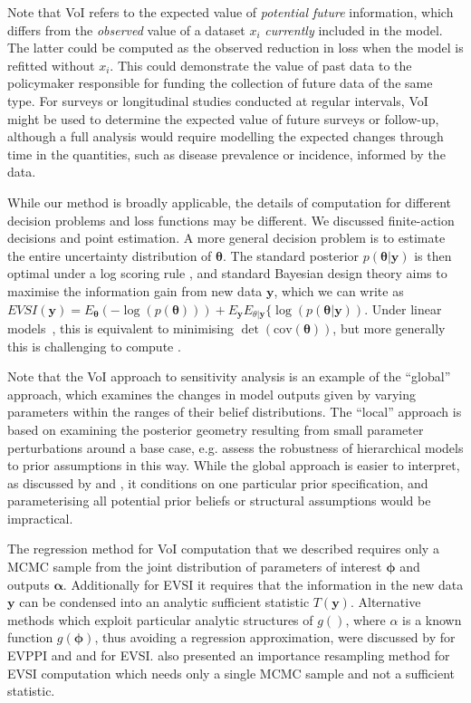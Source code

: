 \documentclass[12pt]{article}\usepackage[]{graphicx}\usepackage[]{color}
\newcommand{\cov}{\mbox{cov}}
\newcommand{\y}{\mathbf{y}}
\begin{document}
Note that VoI refers to the expected value of \emph{potential future} information, which differs from the \emph{observed} value of a dataset $x_i$ \emph{currently} included in the model.   The latter could be computed as the observed reduction in loss when the model is refitted without $x_i$.  This could demonstrate the value of past data to the policymaker responsible for funding the collection of future data of the same type.   For surveys or longitudinal studies conducted at regular intervals, VoI might be used to determine the expected value of future surveys or follow-up, although a full analysis would require modelling the expected changes through time in the quantities, such as disease prevalence or incidence, informed by the data. 

While our method is broadly applicable, the details of computation for different decision problems and loss functions may be different.  We discussed finite-action decisions and point estimation.  A more general decision problem is to  estimate the entire uncertainty distribution of $\bm\theta$.  The standard posterior $p(\bm\theta|\y)$ is then optimal under a log scoring rule \citep{bernardo:smith}, and \citep[following][]{lindley1956measure} standard Bayesian design theory aims to maximise the information gain from new data $\y$, which we can write as $EVSI(\y) =  E_{\bm\theta}(-\log(p(\bm\theta))) + E_{\y} E_{\theta|\y} \{\log(p(\bm\theta|\y))$.  Under linear models~\citep{chaloner1995bayesian}, this is equivalent to minimising $\det(\cov(\bm\theta))$, but more generally this is challenging to compute \citep{ryan2015review}.

Note that the VoI approach to sensitivity analysis is an example of the ``global'' approach, which examines the changes in model outputs given by varying parameters within the ranges of their belief distributions.  The ``local'' approach is based on examining the posterior geometry resulting from small parameter perturbations around a base case, e.g. \citet{roos2015sensitivity} assess the robustness of hierarchical models to prior assumptions in this way.  While the global approach is easier to interpret, as discussed by \citet{oakley:ohagan:psa} and \citet{roos2015sensitivity}, it conditions on one particular prior specification, and parameterising all potential prior beliefs or structural assumptions would be impractical. 

The regression method for VoI computation that we described requires only a MCMC sample from the joint distribution of parameters of interest $\bm\phi$ and outputs $\bm\alpha$.  Additionally for EVSI it requires that the information in the new data $\y$ can be condensed into an analytic sufficient statistic $T(\y)$.   Alternative methods which exploit particular analytic structures of $g()$, where $\alpha$ is a known function $g(\bm\phi)$, thus avoiding a regression approximation, were discussed by \citet{madan2014strategies} for EVPPI and and \citet{ades2004expected} for EVSI.    \citet{menzies2016efficient} also presented an importance resampling method for EVSI computation which needs only a single MCMC sample and not a sufficient statistic. 
\end{document}
